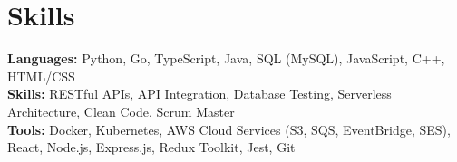 \documentclass[11pt]{article}       %
\begin{document}

\vspace{-18.5pt}

\section*{Skills}
\textbf{Languages:} Python, Go, TypeScript, Java, SQL (MySQL), JavaScript, C++, HTML/CSS\\
\textbf{Skills:} RESTful APIs, API Integration, Database Testing, Serverless Architecture, Clean Code, Scrum Master\\
\textbf{Tools:} Docker, Kubernetes, AWS Cloud Services (S3, SQS, EventBridge, SES), React, Node.js, Express.js, Redux Toolkit, Jest, Git\\

\vspace{-6.5pt}
\end{document}
